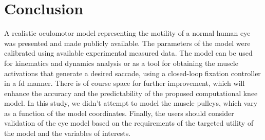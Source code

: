 \documentclass[11pt,a4paper,draft=false]{report}
\begin{document}
\section*{Conclusion}\label{sec:concluison}

A realistic oculomotor model representing the motility of a normal human eye was
presented and made publicly available. The parameters of the model were
calibrated using available experimental measured data. The model can be used for
kinematics and dynamics analysis or as a tool for obtaining the muscle
activations that generate a desired saccade, using a closed-loop fixation
controller in a \gls{fd} manner. There is of course space for further
improvement, which will enhance the accuracy and the predictability of the
proposed computational knee model. In this study, we didn't attempt to model the
muscle pulleys, which vary as a function of the model coordinates. Finally, the
users should consider validation of the eye model based on the requirements of
the targeted utility of the model and the variables of interests.




\end{document}

